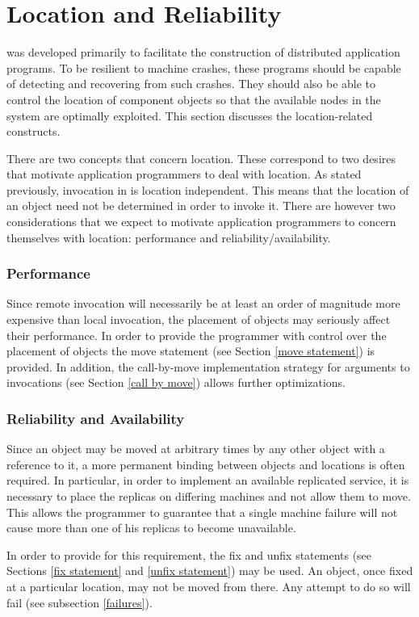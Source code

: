 \section{Location and Reliability}
\label{location and reliability}
\label{locatics}
\emd{} was developed primarily to facilitate the construction of distributed
application programs.  To be resilient to machine crashes, these programs
should be capable of detecting and recovering from such crashes. They should
also be able to control the location of component objects so that the
available nodes in the system are optimally exploited. This section
discusses the \emd{} location-related constructs.

\label{location}
There are two \emd{} concepts that concern location.  These correspond to
two desires that motivate application programmers to deal with location.  As
stated previously, invocation in \emd{} is location independent.  This means
that the location of an object need not be determined in order to invoke it.
There are however two considerations that we expect to motivate application
programmers to concern themselves with location: performance and
reliability/availability.
\subsubsection*{Performance}
Since remote invocation will necessarily be at least an order of magnitude
more expensive than local invocation, the placement of \emd{} objects may
seriously affect their performance.  In order to provide the programmer with
control over the placement of objects the move statement (see Section
\ref{move statement}) is provided.  In addition, the call-by-move
implementation strategy for arguments to invocations (see Section
\ref{call by move}) allows further optimizations.
\subsubsection*{Reliability and Availability}
Since an object may be moved at arbitrary times by any other object with a
reference to it, a more permanent binding between objects and locations is
often required.  In particular, in order to implement an available
replicated service, it is necessary to place the replicas on differing
machines and not allow them to move.  This allows the programmer to
guarantee that a single machine failure will not cause more than one of his
replicas to become unavailable.

In order to provide for this requirement, the fix and unfix statements
(see Sections \ref{fix statement} and \ref{unfix statement}) may be used.
An object, once fixed at a particular location, may not be moved from there.
Any attempt to do so will fail (see subsection \ref{failures}).
